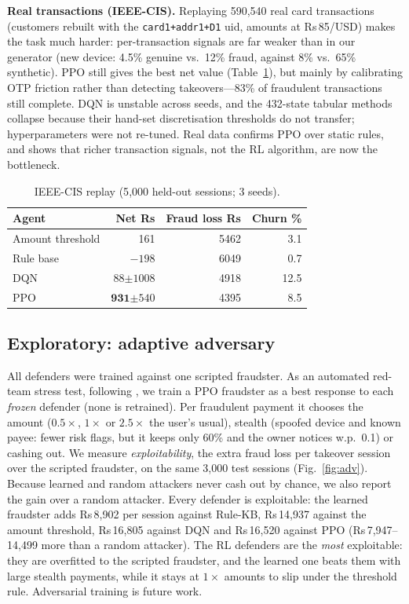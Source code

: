 \documentclass[10pt,twocolumn]{article}
\begin{document}
\textbf{Real transactions (IEEE-CIS).} Replaying 590{,}540 real card transactions (customers rebuilt
with the \texttt{card1+addr1+D1} uid, amounts at Rs\,85/USD) makes the task much harder: per-transaction
signals are far weaker than in our generator (new device: 4.5\% genuine vs.\ 12\% fraud, against 8\% vs.\ 65\%
synthetic). PPO still gives the best net value (Table~\ref{tab:ieee}), but mainly by calibrating OTP friction
rather than detecting takeovers---83\% of fraudulent transactions still complete. DQN is unstable across seeds,
and the 432-state tabular methods collapse because their hand-set discretisation thresholds do not transfer;
hyperparameters were not re-tuned. Real data confirms PPO over static rules, and shows that richer
transaction signals, not the RL algorithm, are now the bottleneck.

\begin{table}[h]\centering\footnotesize\setlength{\tabcolsep}{4pt}
\caption{IEEE-CIS replay (5{,}000 held-out sessions; 3 seeds).}\label{tab:ieee}
\begin{tabular}{lrrr}\toprule
Agent & Net Rs & Fraud loss Rs & Churn \%\\\midrule
Amount threshold & 161 & 5462 & 3.1\\
Rule base & $-198$ & 6049 & 0.7\\
DQN & $88{\scriptstyle\pm1008}$ & 4918 & 12.5\\
PPO & $\mathbf{931}{\scriptstyle\pm540}$ & 4395 & 8.5\\\bottomrule
\end{tabular}\end{table}

\subsection{Exploratory: adaptive adversary}
All defenders were trained against one scripted fraudster. As an automated red-team stress test, following
\cite{mead,fraudrla}, we train a PPO fraudster as a best response to each \emph{frozen} defender (none is
retrained). Per fraudulent payment it chooses the amount ($0.5{\times}$, $1{\times}$ or $2.5{\times}$ the user's
usual), stealth (spoofed device and known payee: fewer risk flags, but it keeps only 60\% and the owner notices
w.p.\ 0.1) or cashing out. We measure \emph{exploitability}, the extra fraud loss per takeover session over the
scripted fraudster, on the same 3{,}000 test sessions (Fig.~\ref{fig:adv}). Because learned and random attackers
never cash out by chance, we also report the gain over a random attacker. Every defender is exploitable: the
learned fraudster adds Rs\,8{,}902 per session against Rule-KB, Rs\,14{,}937 against the amount threshold,
Rs\,16{,}805 against DQN and Rs\,16{,}520 against PPO (Rs\,7{,}947--14{,}499 more than a random attacker). The RL
defenders are the \emph{most} exploitable: they are overfitted to the scripted fraudster, and the learned one
beats them with large stealth payments, while it stays at $1{\times}$ amounts to slip under the threshold rule.
Adversarial training is future work.
\end{document}
